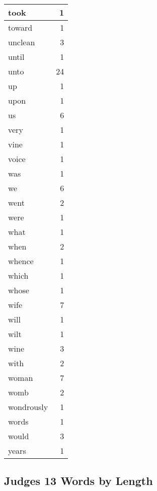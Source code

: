 \begin{center}
\begin{longtable}{l|r}
took & 1\\ \hline 
toward & 1\\ \hline 
unclean & 3\\ \hline 
until & 1\\ \hline 
unto & 24\\ \hline 
up & 1\\ \hline 
upon & 1\\ \hline 
us & 6\\ \hline 
very & 1\\ \hline 
vine & 1\\ \hline 
voice & 1\\ \hline 
was & 1\\ \hline 
we & 6\\ \hline 
went & 2\\ \hline 
were & 1\\ \hline 
what & 1\\ \hline 
when & 2\\ \hline 
whence & 1\\ \hline 
which & 1\\ \hline 
whose & 1\\ \hline 
wife & 7\\ \hline 
will & 1\\ \hline 
wilt & 1\\ \hline 
wine & 3\\ \hline 
with & 2\\ \hline 
woman & 7\\ \hline 
womb & 2\\ \hline 
wondrously & 1\\ \hline 
words & 1\\ \hline 
would & 3\\ \hline 
years & 1\\ \hline 
\end{longtable}
\end{center}





\subsection{Judges 13 Words by Length}


\normalsize
 
